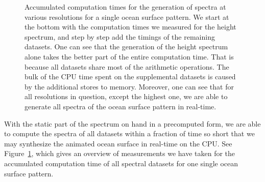 \begin{figure}
\centering
\mydata
{}
\caption{Accumulated computation times for the generation of spectra at various
resolutions for a single ocean surface pattern. We start at the bottom with
the computation times we measured for the height spectrum, and step by step add
the timings of the remaining datasets.
One can see that the generation of the height spectrum alone takes the better
part of the entire computation time.
That is because all datasets share most of the arithmetic operations.
The bulk of the CPU time spent on the supplemental datasets is caused by the
additional stores to memory.
Moreover, one can see that for all resolutions in question, except the highest
one, we are able to generate all spectra of the ocean surface pattern in
real-time.
}
\label{fig:results:h}
\end{figure}
%

With the static part of the spectrum on hand in a precomputed form, we are able
to compute the spectra of all datasets within a fraction of time so short that
we may synthesize the animated ocean surface in real-time on the CPU.
See Figure~\ref{fig:results:h}, which gives an overview of measurements we
have taken for the accumulated computation time of all spectral datasets for
one single ocean surface pattern.
%

